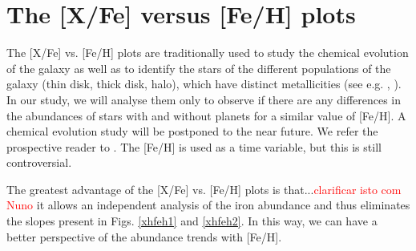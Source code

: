 \documentclass[dvips,12pt,a4paper]{report}
\begin{document}
{{\section {The [X/Fe] versus [Fe/H] plots}
\label{xfefeh}
The [X/Fe] vs. [Fe/H] plots are traditionally used to study the chemical evolution of the galaxy as well as to identify the stars of the different populations of the galaxy (thin disk, thick disk, halo), which have distinct metallicities (see e.g. \citeauthor{Bensby-2003} \citeyear{Bensby-2003}, \citeauthor{Fuhrmann-2004} \citeyear{Fuhrmann-2004}). In our study, we will analyse them only to observe if there are any differences in the abundances of stars with and without planets for a similar value of [Fe/H]. A chemical evolution study will be postponed to the near future. We refer the prospective reader to \citet{McWilliam-1997}. The [Fe/H] is used as a time variable, but this is still controversial. 

The greatest advantage of the [X/Fe] vs. [Fe/H] plots is that...\textcolor{red}{clarificar isto com Nuno} it allows an independent analysis of the iron abundance and thus eliminates the slopes present in Figs. \ref{xhfeh1} and \ref{xhfeh2}. In this way, we can have a better perspective of the abundance trends with [Fe/H]. 

}}
\end{document}
